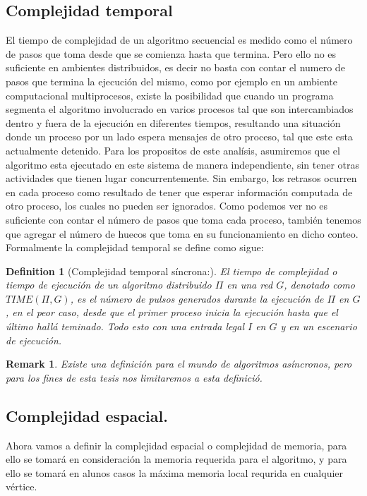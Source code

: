 \documentclass[10pt]{report}
\newtheorem*{remark}{Remark}
\newtheorem{definition}{Definition}
\begin{document}
    \subsection{Complejidad temporal}\label{subsec:complejidad-temporal}
    El tiempo de complejidad de un algoritmo secuencial es medido como el número de pasos que toma desde que se comienza
    hasta que termina.
    Pero ello no es suficiente en ambientes distribuidos, es decir no basta con contar el numero de pasos que termina la
    ejecución del mismo, como por ejemplo en un ambiente computacional multiprocesos, existe la posibilidad que cuando un
    programa segmenta el algoritmo involucrado en varios procesos tal que son intercambiados dentro y fuera de la ejecución
    en diferentes tiempos, resultando una situación donde un proceso por un lado espera mensajes de otro proceso, tal que
    este esta actualmente detenido.\newline
    Para los propositos de este analísis, asumiremos que el algoritmo esta ejecutado en este sistema de manera independiente,
    sin tener otras actividades que tienen lugar concurrentemente.
    Sin embargo, los retrasos ocurren en cada proceso como resultado de tener que esperar información computada de otro
    proceso, los cuales no pueden ser ignorados.\newline
    Como podemos ver no es suficiente con contar el número de pasos que toma cada proceso, también tenemos que agregar
    el número de huecos que toma en su funcionamiento en dicho conteo.
    \newline
    Formalmente la complejidad temporal se define como sigue:
    \begin{definition}
        [Complejidad temporal síncrona:] El tiempo de complejidad o tiempo de ejecución de un
        algoritmo distribuido $\Pi$ en una red $G$, denotado como $TIME(\Pi,G)$, es el número de pulsos generados
        durante la ejecución de $\Pi$ en $G$, en el peor caso, desde que el primer proceso inicia la ejecución
        hasta que el último hallá teminado.
        Todo esto con una entrada legal $I$ en $G$ y en un escenario de ejecución.
    \end{definition}
    \begin{remark}
        Existe una definición para el mundo de algoritmos asíncronos, pero para los fines
    de esta tesis nos limitaremos a esta definició.
    \end{remark}

    \subsection{Complejidad espacial.}\label{subsec:complejidad-espacial.}
    Ahora vamos a definir la complejidad espacial o complejidad de memoria,
        para ello se tomará en consideración la memoria requerida para el algoritmo, y para ello se tomará en alunos casos
    la máxima memoria local requrida en cualquier vértice.
\end{document}
